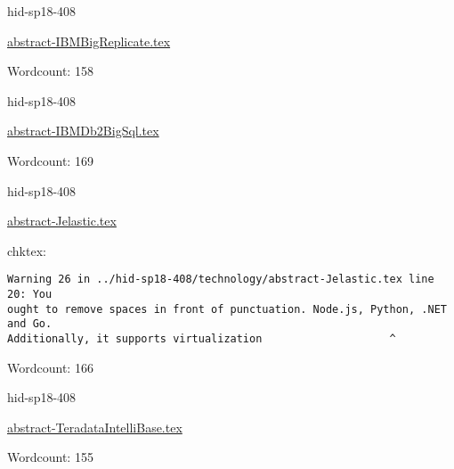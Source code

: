 

\begin{IU}

hid-sp18-408

\href{https://github.com/cloudmesh-community/hid-sp18-408/blob/master//technology/abstract-IBMBigReplicate.tex}{abstract-IBMBigReplicate.tex}

 

Wordcount: 158

\end{IU}



\begin{IU}

hid-sp18-408

\href{https://github.com/cloudmesh-community/hid-sp18-408/blob/master//technology/abstract-IBMDb2BigSql.tex}{abstract-IBMDb2BigSql.tex}

 

Wordcount: 169

\end{IU}



\begin{IU}

hid-sp18-408

\href{https://github.com/cloudmesh-community/hid-sp18-408/blob/master//technology/abstract-Jelastic.tex}{abstract-Jelastic.tex}

 
chktex:
\begin{tiny}
\begin{verbatim}
Warning 26 in ../hid-sp18-408/technology/abstract-Jelastic.tex line 20: You
ought to remove spaces in front of punctuation. Node.js, Python, .NET and Go.
Additionally, it supports virtualization                    ^
\end{verbatim}
\end{tiny}

Wordcount: 166

\end{IU}



\begin{IU}

hid-sp18-408

\href{https://github.com/cloudmesh-community/hid-sp18-408/blob/master//technology/abstract-TeradataIntelliBase.tex}{abstract-TeradataIntelliBase.tex}

 

Wordcount: 155

\end{IU}

